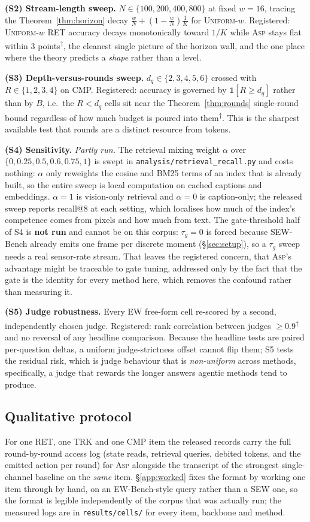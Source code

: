 \documentclass[10pt]{article}
\theoremstyle{definition}
\theoremstyle{plain}
\newcommand{\pred}{\textsuperscript{\textcolor{cpred}{$\dagger$}}}
\newcommand{\ASP}{\textsc{Asp}}
\begin{document}
\textbf{(S2) Stream-length sweep.} $N\in\{100,200,400,800\}$ at fixed $w{=}16$, tracing the Theorem~\ref{thm:horizon} decay $\frac wN+(1-\frac wN)\frac1K$ for \textsc{Uniform-}$w$. Registered: \textsc{Uniform-}$w$ RET accuracy decays monotonically toward $1/K$ while \ASP{} stays flat within $3$ points\pred{}, the cleanest single picture of the horizon wall, and the one place where the theory predicts a \emph{shape} rather than a level.

\textbf{(S3) Depth-versus-rounds sweep.} $d_q\in\{2,3,4,5,6\}$ crossed with $R\in\{1,2,3,4\}$ on CMP. Registered: accuracy is governed by $\mathbb{1}[R\ge d_q]$ rather than by $B$, i.e.\ the $R{<}d_q$ cells sit near the Theorem~\ref{thm:rounds} single-round bound regardless of how much budget is poured into them\pred{}. This is the sharpest available test that rounds are a distinct resource from tokens.

\textbf{(S4) Sensitivity.} \emph{Partly run.} The retrieval mixing weight $\alpha$ over $\{0,0.25,0.5,0.6,0.75,1\}$ is swept in \texttt{analysis/retrieval\_recall.py} and costs nothing: $\alpha$ only reweights the cosine and BM25 terms of an index that is already built, so the entire sweep is local computation on cached captions and embeddings. $\alpha{=}1$ is vision-only retrieval and $\alpha{=}0$ is caption-only; the released sweep reports recall@$8$ at each setting, which localises how much of the index's competence comes from pixels and how much from text. The gate-threshold half of S4 is \textbf{not run} and cannot be on this corpus: $\tau_g{=}0$ is forced because SEW-Bench already emits one frame per discrete moment (\S\ref{sec:setup}), so a $\tau_g$ sweep needs a real sensor-rate stream. That leaves the registered concern, that \ASP{}'s advantage might be traceable to gate tuning, addressed only by the fact that the gate is the identity for every method here, which removes the confound rather than measuring it.

\textbf{(S5) Judge robustness.} Every EW free-form cell re-scored by a second, independently chosen judge. Registered: rank correlation between judges $\ge0.9$\pred{} and no reversal of any headline comparison. Because the headline tests are paired per-question deltas, a uniform judge-strictness offset cannot flip them; S5 tests the residual risk, which is judge behaviour that is \emph{non-uniform} across methods, specifically, a judge that rewards the longer answers agentic methods tend to produce.

\subsection{Qualitative protocol}
For one RET, one TRK and one CMP item the released records carry the full round-by-round access log (state reads, retrieval queries, debited tokens, and the emitted action per round) for \ASP{} alongside the transcript of the strongest single-channel baseline on the \emph{same} item. \S\ref{app:worked} fixes the format by working one item through by hand, on an EW-Bench-style query rather than a SEW one, so the format is legible independently of the corpus that was actually run; the measured logs are in \texttt{results/cells/} for every item, backbone and method.
\end{document}
